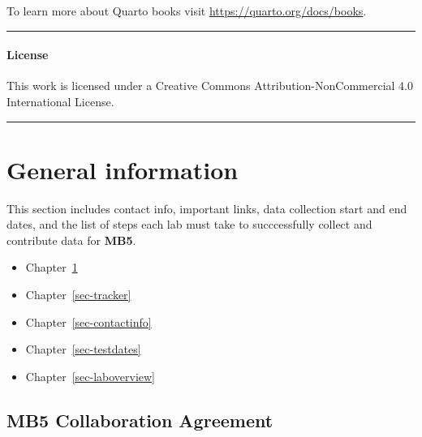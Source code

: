 \documentclass[
  letterpaper,
  DIV=11,
  numbers=noendperiod,
  oneside]{scrreprt}
\providecommand{\tightlist}{%
  \setlength{\itemsep}{0pt}\setlength{\parskip}{0pt}}
\begin{document}
To learn more about Quarto books visit
\url{https://quarto.org/docs/books}.

\begin{center}\rule{0.5\linewidth}{0.5pt}\end{center}

\subsection*{License}\label{license}

This work is licensed under a Creative Commons Attribution-NonCommercial
4.0 International License.

\begin{center}\rule{0.5\linewidth}{0.5pt}\end{center}

\part{General information}

This section includes contact info, important links, data collection
start and end dates, and the list of steps each lab must take to
succcessfully collect and contribute data for \textbf{MB5}.

\begin{itemize}
\tightlist
\item
  Chapter~\ref{sec-collaboration}
\item
  Chapter~\ref{sec-tracker}
\item
  Chapter~\ref{sec-contactinfo}
\item
  Chapter~\ref{sec-testdates}
\item
  Chapter~\ref{sec-laboverview}
\end{itemize}

\chapter{MB5 Collaboration Agreement}\label{sec-collaboration}

\begin{tcolorbox}[enhanced jigsaw, coltitle=black, colframe=quarto-callout-important-color-frame, titlerule=0mm, colback=white, arc=.35mm, toprule=.15mm, left=2mm, colbacktitle=quarto-callout-important-color!10!white, opacityback=0, bottomtitle=1mm, title=\textcolor{quarto-callout-important-color}{\faExclamation}\hspace{0.5em}{By participating in ManyBabies 5, you agree to abide by the \textbf{MB5}
Collaboration Agreement.}, breakable, rightrule=.15mm, opacitybacktitle=0.6, toptitle=1mm, leftrule=.75mm, bottomrule=.15mm]

\end{tcolorbox}
\end{document}
